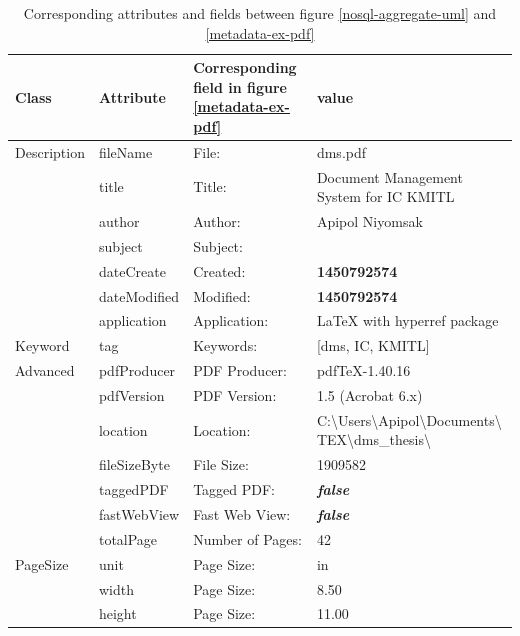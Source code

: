 \begin{table}[ht]
	\centering
	\begin{tabular}{C{0.15\textwidth} C{0.15\textwidth} L{0.2\textwidth} L{0.3\textwidth}}
		\hline
		Class & Attribute & Corresponding field in figure \ref{metadata-ex-pdf} & value \\
		\hline
		Description & fileName & File: & dms.pdf \\
		& title & Title: & Document Management System for IC KMITL \\
		& author & Author:  & Apipol Niyomsak \\
		& subject & Subject: & \\
		& dateCreate & Created: & \textbf{1450792574} \\
		& dateModified & Modified: & \textbf{1450792574} \\
		& application & Application: & LaTeX with hyperref package \\
		Keyword & tag & Keywords: & [dms, IC, KMITL]\\
		Advanced & pdfProducer & PDF Producer: & pdfTeX-1.40.16 \\
		& pdfVersion & PDF Version: & 1.5 (Acrobat 6.x) \\
		& location & Location: &  C:\textbackslash Users\textbackslash Apipol\textbackslash Documents\textbackslash \newline 
		TEX\textbackslash dms\_thesis\textbackslash \\
		& fileSizeByte & File Size: & 1909582 \\
		& taggedPDF & Tagged PDF: & \textit{\textbf{false}} \\
		& fastWebView & Fast Web View: & \textit{\textbf{false}} \\
		& totalPage & Number of Pages: & 42 \\
		PageSize & unit & Page Size: & in \\
		& width & Page Size: & 8.50 \\
		& height & Page Size: & 11.00 \\
		\hline
	\end{tabular}
	\caption{Corresponding attributes and fields between figure \ref{nosql-aggregate-uml} and \ref{metadata-ex-pdf}}
	\label{tbl:uml-corespond-pdf}
\end{table}

